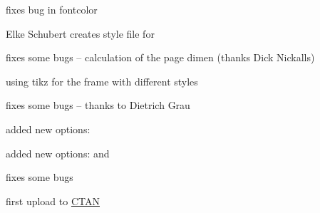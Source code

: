 \documentclass[parskip=false,english,11pt]{ltxmdf}
\begin{document}
\begin{itemize*}
\item fixes bug in fontcolor
\end{itemize*}

\begin{itemize*}
\item Elke Schubert creates style file for 
\item fixes some bugs -- calculation of the page dimen (thanks  Dick Nickalls)
\item using tikz for the frame with different styles
\end{itemize*}

\begin{itemize*}
\item fixes some bugs -- thanks to Dietrich Grau
\item added new options: 
\end{itemize*}

\begin{itemize*}
\item added new options:  and 
\item fixes some bugs
\end{itemize*}

\begin{itemize*}
\item first upload to \href{http://dante.ctan.org/upload}{CTAN}
\end{itemize*}
\end{document}
